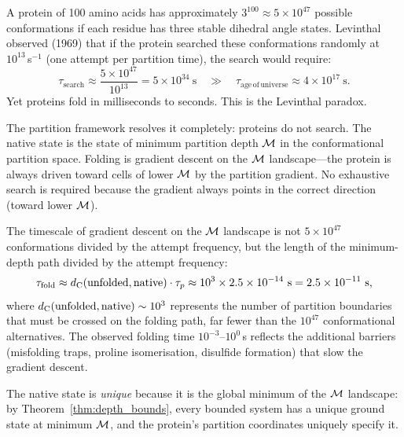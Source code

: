 \begin{example}
\label{ex:levinthal}
A protein of 100 amino acids has approximately $3^{100} \approx 5 \times 10^{47}$
possible conformations if each residue has three stable dihedral angle states.
Levinthal observed (1969) that if the protein searched these conformations
randomly at $10^{13}$\,s$^{-1}$ (one attempt per partition time), the search
would require:
\begin{equation}
  \tau_{\mathrm{search}} \approx \frac{5 \times 10^{47}}{10^{13}} = 5 \times 10^{34}\ \mathrm{s}
  \quad \gg \quad \tau_{\mathrm{age\,of\,universe}} \approx 4 \times 10^{17}\ \mathrm{s}.
\end{equation}
Yet proteins fold in milliseconds to seconds. This is the Levinthal paradox.

The partition framework resolves it completely: proteins do not search. The
native state is the state of minimum partition depth $\mathcal{M}$ in the
conformational partition space. Folding is gradient descent on the
$\mathcal{M}$ landscape---the protein is always driven toward cells of lower
$\mathcal{M}$ by the partition gradient. No exhaustive search is required because
the gradient always points in the correct direction (toward lower $\mathcal{M}$).

The timescale of gradient descent on the $\mathcal{M}$ landscape is not
$5 \times 10^{47}$ conformations divided by the attempt frequency, but
the length of the minimum-depth path divided by the attempt frequency:
\begin{equation}
  \tau_{\mathrm{fold}} \approx d_{\mathrm{C}}(\text{unfolded},\text{native}) \cdot \tau_p
    \approx 10^3 \times 2.5 \times 10^{-14}\ \mathrm{s} = 2.5 \times 10^{-11}\ \mathrm{s},
\end{equation}
where $d_{\mathrm{C}}(\text{unfolded},\text{native}) \sim 10^3$ represents the number
of partition boundaries that must be crossed on the folding path, far fewer
than the $10^{47}$ conformational alternatives. The observed folding time
$10^{-3}$--$10^0$\,s reflects the additional barriers (misfolding traps,
proline isomerisation, disulfide formation) that slow the gradient descent.

The native state is \emph{unique} because it is the global minimum of the
$\mathcal{M}$ landscape: by Theorem~\ref{thm:depth_bounds}, every bounded system
has a unique ground state at minimum $\mathcal{M}$, and the protein's partition
coordinates uniquely specify it.
\end{example}

